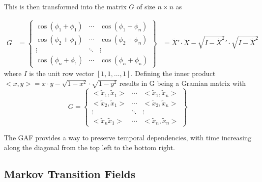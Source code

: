 This is then transformed into the matrix $G$ of size $n \times n$ as

\begin{align}
	G &= \begin{Bmatrix}
		\cos(\phi_1 + \phi_1) & \cdots & \cos(\phi_1 + \phi_n) \\
		\cos(\phi_2 + \phi_1) & \cdots & \cos(\phi_2 + \phi_n) \\
		\vdots                & \ddots & \vdots \\
		\cos(\phi_n + \phi_1) & \cdots & \cos(\phi_n + \phi_n)
	\end{Bmatrix}
	&= \tilde{X}' \cdot \tilde{X} - \sqrt{I - \tilde{X}^2}' \cdot \sqrt{I - \tilde{X}^2}
\end{align}
where $I$ is the unit row vector $[1, 1, \ldots, 1]$.
Defining the inner product $< x,y> = x \cdot y - \sqrt{1 - x^2} \cdot \sqrt{1-y^2}$ results in G being a Gramian matrix with
\begin{equation}
	G = \begin{Bmatrix}
		< \tilde{x}_1, \tilde{x}_1 > & \cdots & < \tilde{x}_1, \tilde{x}_n >\\
		< \tilde{x}_2, \tilde{x}_1 > & \cdots & < \tilde{x}_2, \tilde{x}_n > \\
		\vdots                       & \ddots & \vdots \\
		< \tilde{x}_n \tilde{x}_1 > & \cdots & < \tilde{x}_n, \tilde{x}_n >
	\end{Bmatrix}
\end{equation}

The GAF provides a way to preserve temporal dependencies, with time increasing along the diagonal from the top left to the bottom right.

\subsection{Markov Transition Fields}

